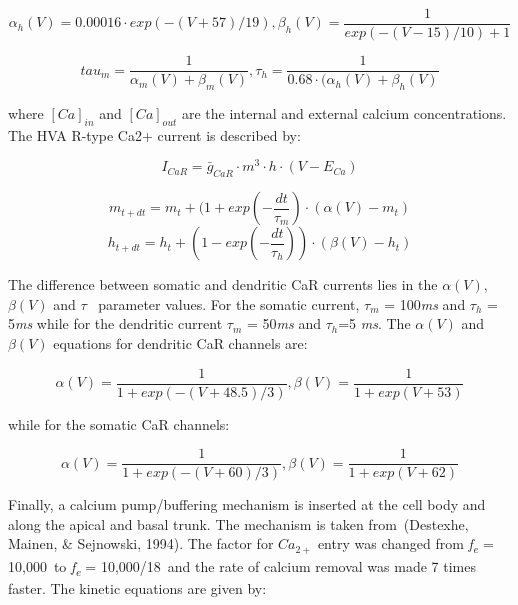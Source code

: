 \documentclass[12pt]{article}
\begin{document}
\begin{equation}
\alpha_h(V)=0.00016\cdot exp(-(V+57)/19),\beta_h(V)=\frac 1{exp(-(V-15)/10)+1}
\end{equation}

\begin{equation}
tau_m=\frac {1}{\alpha_m(V)+\beta_m(V)}, \tau_h=\frac {1}{0.68\cdot (\alpha_h(V)+\beta_h(V)}
\end{equation}

where
$[Ca]_{in}$ and $[Ca]_{out}$ are the
internal and external calcium concentrations. The HVA R-type Ca2+ current is described by:


\begin{equation}
I_{CaR}=\bar g_{CaR}\cdot m^3\cdot h\cdot
(V-E_{Ca})
\end{equation}

\begin{equation}
m_{t+dt}=m_t+(1+exp(-\frac{dt}{\tau_m})\cdot (\alpha(V)-m_t)
\end{equation}
\begin{equation}
h_{t+dt}=h_t+(1-exp(-\frac{dt}{\tau_h}))\cdot (\beta(V) - h_t)
\end{equation}

The difference between somatic and dendritic CaR currents lies in the $\alpha(V)$, $\beta(V)$ and $\tau$ ~parameter
values. For the somatic current, $\tau_m$ = 100\textit{ms} and
$\tau_h$ = 5\textit{ms} while for the dendritic current $\tau_m$ = 50\textit{ms} and $\tau_h$=5 \textit{ ms}. The $\alpha(V)$ and $\beta(V)$ equations for dendritic CaR channels are:


\begin{equation}
\alpha(V)=\frac {1}{1+exp(-(V+48.5)/3)},\beta(V)=\frac {1}{1+exp(V+53)}
\end{equation}

while for the somatic CaR channels:


\begin{equation}
\alpha(V)=\frac {1}{1+exp(-(V+60)/3)},\beta(V)=\frac {1}{1+exp(V+62)}
\end{equation}

Finally, a calcium pump/buffering mechanism is inserted at the cell body and along the apical and basal trunk. The
mechanism is taken from~(Destexhe, Mainen, \& Sejnowski, 1994). The factor for
$Ca_{2+}$ entry was changed from
\textit{f}\textit{\textsubscript{e}}\textit{ }=\textit{ }10,000~to \textit{f}\textit{\textsubscript{e}}\textit{
}=\textit{ }10,000/18~and the rate of calcium removal was made 7 times faster. The kinetic equations are given by:
\end{document}
